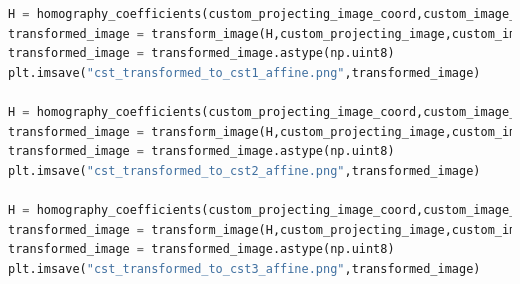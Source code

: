 \documentclass{article}
\begin{document}
\begin{lstlisting}[language=Python]
H = homography_coefficients(custom_projecting_image_coord,custom_image_1_coord,mode='affine')
transformed_image = transform_image(H,custom_projecting_image,custom_image_1)
transformed_image = transformed_image.astype(np.uint8)
plt.imsave("cst_transformed_to_cst1_affine.png",transformed_image)

H = homography_coefficients(custom_projecting_image_coord,custom_image_2_coord,mode='affine')
transformed_image = transform_image(H,custom_projecting_image,custom_image_2)
transformed_image = transformed_image.astype(np.uint8)
plt.imsave("cst_transformed_to_cst2_affine.png",transformed_image)

H = homography_coefficients(custom_projecting_image_coord,custom_image_3_coord,mode='affine')
transformed_image = transform_image(H,custom_projecting_image,custom_image_3)
transformed_image = transformed_image.astype(np.uint8)
plt.imsave("cst_transformed_to_cst3_affine.png",transformed_image)

\end{lstlisting}
\end{document}
